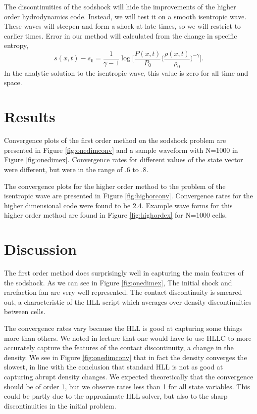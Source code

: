 \documentclass{article}
\begin{document}
The discontinuities of the sodshock will hide the improvements of the higher order hydrodynamics code. Instead, we will test it on a smooth isentropic wave. These waves will steepen and form a shock at late times, so we will restrict to earlier times. Error in our method will calculated from the change in specific entropy, 
\begin{equation}
    s(x,t) - s_0 = \frac{1}{\gamma -1} \log\bigg[\frac{P(x,t)}{P_0}\bigg(\frac{\rho(x,t)}{\rho_0}\bigg)^{-\gamma} \bigg].
\end{equation}
In the analytic solution to the isentropic wave, this value is zero for all time and space. 

\section*{Results}

Convergence plots of the first order method on the sodshock problem are presented in Figure \ref{fig:onedimconv} and a sample waveform with N=1000 in Figure \ref{fig:onedimex}. Convergence rates for different values of the state vector were different, but were in the range of .6 to .8. 

The convergence plots for the higher order method to the problem of the isentropic wave are presented in Figure \ref{fig:highorconv}. Convergence rates for the higher dimensional code were found to be 2.4. Example wave forms for this higher order method are found in Figure \ref{fig:highordex} for N=1000 cells. 
  
\section*{Discussion}

The first order method does surprisingly well in capturing the main features of the sodshock. As we can see in Figure \ref{fig:onedimex}, The initial shock and rarefaction fan are very well represented. The contact discontinuity is smeared out, a characteristic of the HLL script which averages over density discontinuities between cells. 

The convergence rates vary because the HLL is good at capturing some things more than others. We noted in lecture that one would have to use HLLC to more accurately capture the features of the contact discontinuity, a change in the density. We see in Figure \ref{fig:onedimconv} that in fact the density converges the slowest, in line with the conclusion that standard HLL is not as good at capturing abrupt density changes. We expected theoretically that the convergence should be of order 1, but we observe rates less than 1 for all state variables. This could be partly due to the approximate HLL solver, but also to the sharp discontinuities in the initial problem. 
\end{document}
